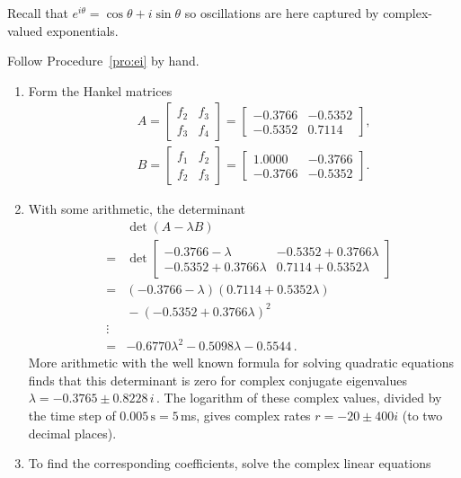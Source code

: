 \begin{draft}
\begin{example}
Recall  that \(e^{i\theta}=\cos\theta+i\sin\theta\) so oscillations are here captured by complex-valued exponentials.

\begin{solution} 
Follow Procedure~\ref{pro:ei} by hand. 
\begin{enumerate}
\item 
Form the Hankel matrices
\begin{eqnarray*}&&
A=\begin{bmatrix} f_2&f_3\\f_3&f_4 \end{bmatrix}
=\begin{bmatrix} -0.3766 & -0.5352
\\  -0.5352&   0.7114 \end{bmatrix},
\\&&
B=\begin{bmatrix} f_1&f_2\\f_2&f_3 \end{bmatrix}
=\begin{bmatrix} 1.0000&  -0.3766
\\  -0.3766&  -0.5352 \end{bmatrix}.
\end{eqnarray*}
\item 
With some arithmetic, the determinant 
\begin{eqnarray*}
&&\det(A-\lambda B)
\\&=&\det\begin{bmatrix} -0.3766-\lambda & -0.5352+0.3766\lambda
\\  -0.5352+0.3766\lambda&   0.7114+0.5352\lambda \end{bmatrix} 
\\&=&(-0.3766-\lambda)(0.7114+0.5352\lambda)
\\&&{}
-(-0.5352+0.3766\lambda)^2
\\&\vdots& 
\\&=& -0.6770\lambda^2  -0.5098\lambda  -0.5544\,.
\end{eqnarray*}
More arithmetic with the well known formula for solving quadratic equations finds that this determinant is zero for complex conjugate eigenvalues \(\lambda=-0.3765 \pm 0.8228\,i\)\,.
The logarithm of these complex values, divided by the time step of \(0.005\,\text{s}=5\,\)ms, gives complex rates \(r=-20\pm400i\) (to two decimal places).
\item 
To find the corresponding coefficients, solve the complex linear equations
\begin{eqnarray*}&&

\end{eqnarray*}
\end{enumerate}
\end{solution}
\end{example}
\end{draft}
